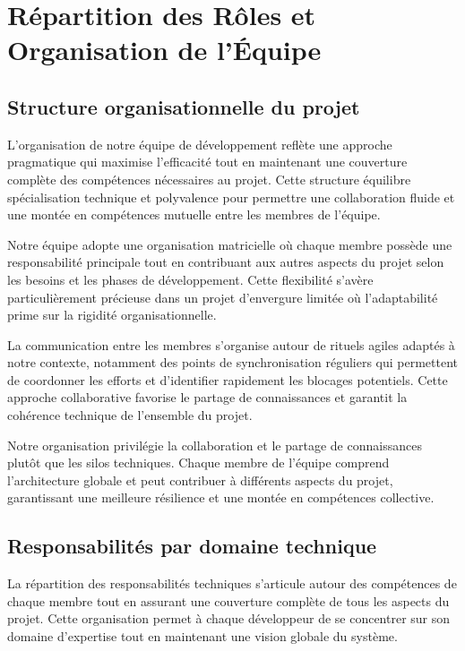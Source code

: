 \section{Répartition des Rôles et Organisation de l'Équipe}

\subsection{Structure organisationnelle du projet}

L'organisation de notre équipe de développement reflète une approche pragmatique qui maximise l'efficacité tout en maintenant une couverture complète des compétences nécessaires au projet. Cette structure équilibre spécialisation technique et polyvalence pour permettre une collaboration fluide et une montée en compétences mutuelle entre les membres de l'équipe.

Notre équipe adopte une organisation matricielle où chaque membre possède une responsabilité principale tout en contribuant aux autres aspects du projet selon les besoins et les phases de développement. Cette flexibilité s'avère particulièrement précieuse dans un projet d'envergure limitée où l'adaptabilité prime sur la rigidité organisationnelle.

La communication entre les membres s'organise autour de rituels agiles adaptés à notre contexte, notamment des points de synchronisation réguliers qui permettent de coordonner les efforts et d'identifier rapidement les blocages potentiels. Cette approche collaborative favorise le partage de connaissances et garantit la cohérence technique de l'ensemble du projet.

\begin{infobox}
Notre organisation privilégie la collaboration et le partage de connaissances plutôt que les silos techniques. Chaque membre de l'équipe comprend l'architecture globale et peut contribuer à différents aspects du projet, garantissant une meilleure résilience et une montée en compétences collective.
\end{infobox}

\subsection{Responsabilités par domaine technique}

La répartition des responsabilités techniques s'articule autour des compétences de chaque membre tout en assurant une couverture complète de tous les aspects du projet. Cette organisation permet à chaque développeur de se concentrer sur son domaine d'expertise tout en maintenant une vision globale du système.

